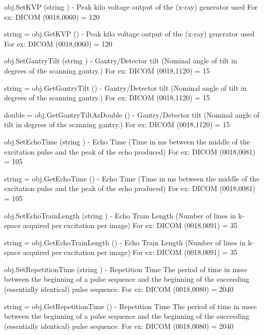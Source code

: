 \begin{DoxyItemize}
\item {\ttfamily obj.\-Set\-K\-V\-P (string )} -\/ Peak kilo voltage output of the (x-\/ray) generator used For ex\-: D\-I\-C\-O\-M (0018,0060) = 120  
\item {\ttfamily string = obj.\-Get\-K\-V\-P ()} -\/ Peak kilo voltage output of the (x-\/ray) generator used For ex\-: D\-I\-C\-O\-M (0018,0060) = 120  
\item {\ttfamily obj.\-Set\-Gantry\-Tilt (string )} -\/ Gantry/\-Detector tilt (Nominal angle of tilt in degrees of the scanning gantry.) For ex\-: D\-I\-C\-O\-M (0018,1120) = 15  
\item {\ttfamily string = obj.\-Get\-Gantry\-Tilt ()} -\/ Gantry/\-Detector tilt (Nominal angle of tilt in degrees of the scanning gantry.) For ex\-: D\-I\-C\-O\-M (0018,1120) = 15  
\item {\ttfamily double = obj.\-Get\-Gantry\-Tilt\-As\-Double ()} -\/ Gantry/\-Detector tilt (Nominal angle of tilt in degrees of the scanning gantry.) For ex\-: D\-I\-C\-O\-M (0018,1120) = 15  
\item {\ttfamily obj.\-Set\-Echo\-Time (string )} -\/ Echo Time (Time in ms between the middle of the excitation pulse and the peak of the echo produced) For ex\-: D\-I\-C\-O\-M (0018,0081) = 105  
\item {\ttfamily string = obj.\-Get\-Echo\-Time ()} -\/ Echo Time (Time in ms between the middle of the excitation pulse and the peak of the echo produced) For ex\-: D\-I\-C\-O\-M (0018,0081) = 105  
\item {\ttfamily obj.\-Set\-Echo\-Train\-Length (string )} -\/ Echo Train Length (Number of lines in k-\/space acquired per excitation per image) For ex\-: D\-I\-C\-O\-M (0018,0091) = 35  
\item {\ttfamily string = obj.\-Get\-Echo\-Train\-Length ()} -\/ Echo Train Length (Number of lines in k-\/space acquired per excitation per image) For ex\-: D\-I\-C\-O\-M (0018,0091) = 35  
\item {\ttfamily obj.\-Set\-Repetition\-Time (string )} -\/ Repetition Time The period of time in msec between the beginning of a pulse sequence and the beginning of the succeeding (essentially identical) pulse sequence. For ex\-: D\-I\-C\-O\-M (0018,0080) = 2040  
\item {\ttfamily string = obj.\-Get\-Repetition\-Time ()} -\/ Repetition Time The period of time in msec between the beginning of a pulse sequence and the beginning of the succeeding (essentially identical) pulse sequence. For ex\-: D\-I\-C\-O\-M (0018,0080) = 2040  

\end{DoxyItemize}
